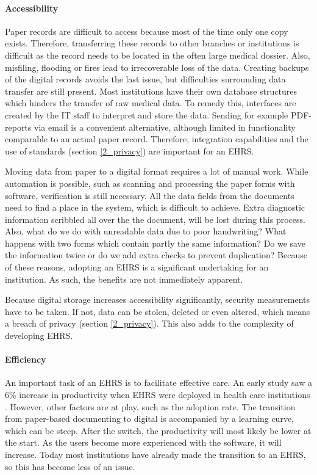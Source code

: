         \paragraph{Accessibility} Paper records are difficult to access because most of the time only one copy exists. Therefore, transferring these records to other branches or institutions is difficult as the record needs to be located in the often large medical dossier. Also, misfiling, flooding or fires lead to irrecoverable loss of the data. Creating backups of the digital records avoids the last issue, but difficulties surrounding data transfer are still present. Most institutions have their own database structures which hinders the transfer of raw medical data. To remedy this, interfaces are created by the IT staff to interpret and store the data. Sending for example PDF-reports via email is a convenient alternative, although limited in functionality comparable to an actual paper record. Therefore, integration capabilities and the use of standards (section \ref{2_privacy}) are important for an EHRS. 

        Moving data from paper to a digital format requires a lot of manual work. While automation is possible, such as scanning and processing the paper forms with software, verification is still necessary. All the data fields from the documents need to find a place in the system, which is difficult to achieve. Extra diagnostic information scribbled all over the the document, will be lost during this process. Also, what do we do with unreadable data due to poor handwriting? What happens with two forms which contain partly the same information? Do we save the information twice or do we add extra checks to prevent duplication? Because of these reasons, adopting an EHRS is a significant undertaking for an institution. As such, the benefits are not immediately apparent.

        Because digital storage increases accessibility significantly, security measurements have to be taken. If not, data can be stolen, deleted or even altered, which means a breach of privacy (section \ref{2_privacy}). This also adds to the complexity of developing EHRS. 

        \paragraph{Efficiency} An important task of an EHRS is to facilitate effective care. An early study saw a 6\% increase in productivity when EHRS were deployed in health care institutions \cite{ehrs_efficiency}. However, other factors are at play, such as the adoption rate. The transition from paper-based documenting to digital is accompanied by a learning curve, which can be steep. After the switch, the productivity will most likely be lower at the start. As the users become more experienced with the software, it will increase. Today most institutions have already made the transition to an EHRS, so this has become less of an issue.


